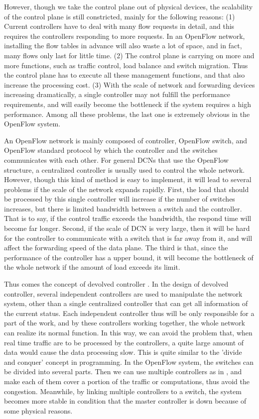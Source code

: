 However, though we take the control plane out of physical devices, the scalability of the control plane is still constricted, mainly for the following reasons: (1) Current controllers have to deal with many flow requests in detail, and this requires the controllers responding to more requests. In an OpenFlow network, installing the flow tables in advance will also waste a lot of space, and in fact, many flows only last for little time. (2) The control plane is carrying on more and more functions, such as traffic control, load balance and switch migration. Thus the control plane has to execute all these management functions, and that also increase the processing cost. (3) With the scale of network and forwarding devices increasing dramatically, a single controller may not fulfill the performance requirements, and will easily become the bottleneck if the system requires a high performance. Among all these problems, the last one is extremely obvious in the OpenFlow system.

An OpenFlow network is mainly composed of controller, OpenFlow switch, and OpenFlow standard protocol by which the controller and the switches communicates with each other. For general DCNs that use the OpenFlow structure, a centralized controller is usually used to control the whole network. However, though this kind of method is easy to implement, it will lead to several problems if the scale of the network expands rapidly. First, the load that should be processed by this single controller will increase if the number of switches increases, but there is limited bandwidth between a switch and the controller. That is to say, if the control traffic exceeds the bandwidth, the respond time will become far longer. Second, if the scale of DCN is very large, then it will be hard for the controller to communicate with a switch that is far away from it, and will affect the forwarding speed of the data plane. The third is that, since the performance of the controller has a upper bound, it will become the bottleneck of the whole network if the amount of load exceeds its limit.

Thus comes the concept of devolved controller \cite{devolved}. In the design of devolved controller, several independent controllers are used to manipulate the network system, other than a single centralized controller that can get all information of the current status. Each independent controller thus will be only responsible for a part of the work, and by these controllers working together, the whole network can realize its normal function. In this way, we can avoid the problem that, when real time traffic are to be processed by the controllers, a quite large amount of data would cause the data processing slow. This is quite similar to the 'divide and conquer' concept in programming. In the OpenFlow system, the switches can be divided into several parts. Then we can use multiple controllers as in \cite{devolved,devolvedglobecom,multictr,elasticsdn}, and make each of them cover a portion of the traffic or computations, thus avoid the congestion. Meanwhile, by linking multiple controllers to a switch, the system becomes more stable in condition that the master controller is down because of some physical reasons.

